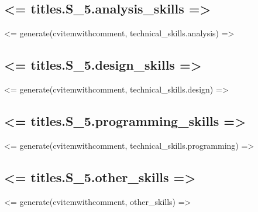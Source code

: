 \documentclass[11pt,a4paper,sans]{moderncv}
\begin{document}
		\subsection{<= titles.S_5.analysis_skills =>}
			<= generate(cvitemwithcomment, technical_skills.analysis) =>
		\subsection{<= titles.S_5.design_skills =>}
			<= generate(cvitemwithcomment, technical_skills.design) =>
		\subsection{<= titles.S_5.programming_skills =>}
			<= generate(cvitemwithcomment, technical_skills.programming) =>
    \subsection{<= titles.S_5.other_skills =>}
		  <= generate(cvitemwithcomment, other_skills) =>





	\renewcommand{\refname}{Articles}
	\nocite{*}
	
	
\end{document}
